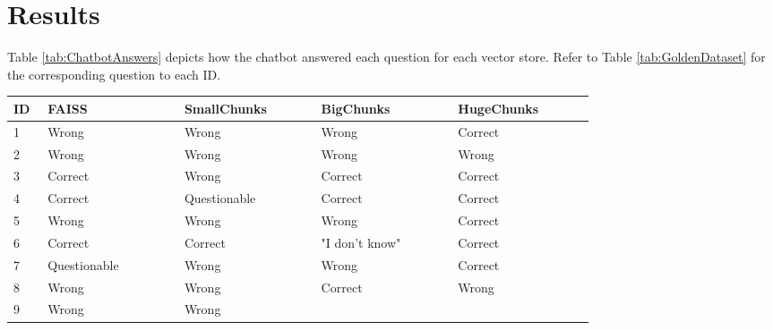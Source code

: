 \section{Results}
Table \ref{tab:ChatbotAnswers} depicts how the chatbot answered each question for each vector store. Refer to 
Table \ref{tab:GoldenDataset} for the corresponding question to each ID.

\begin{longtable}{ | p{0.05\linewidth} | p{0.2\linewidth} | p{0.2\linewidth} | p{0.2\linewidth} | p{0.2\linewidth} | }
    \hline
    \cellcolor{blue!25} ID & \cellcolor{blue!25} FAISS & \cellcolor{blue!25} SmallChunks & \cellcolor{blue!25} BigChunks & \cellcolor{blue!25}HugeChunks \\
    \hline
    \cellcolor{blue!25} 1 & \cellcolor{red!25} Wrong & \cellcolor{red!25} Wrong  
                          & \cellcolor{red!25} Wrong & \cellcolor{green!25} Correct\\
    \hline
    \cellcolor{blue!25} 2 & \cellcolor{red!25} Wrong & \cellcolor{red!25} Wrong
                          & \cellcolor{red!25} Wrong & \cellcolor{red!25} Wrong\\
    \hline 
    \cellcolor{blue!25} 3 & \cellcolor{green!25} Correct & \cellcolor{red!25} Wrong
                          & \cellcolor{green!25} Correct & \cellcolor{green!25} Correct\\
    \hline 
    \cellcolor{blue!25} 4 & \cellcolor{green!25} Correct & \cellcolor{yellow!25} Questionable 
                          & \cellcolor{green!25} Correct & \cellcolor{green!25} Correct \\
    \hline 
    \cellcolor{blue!25} 5 & \cellcolor{red!25} Wrong & \cellcolor{red!25} Wrong 
                          & \cellcolor{red!25} Wrong & \cellcolor{green!25} Correct\\
    \hline 
    \cellcolor{blue!25} 6 & \cellcolor{green!25} Correct & \cellcolor{green!25} Correct 
                          & \cellcolor{red!40} "I don't know" & \cellcolor{green!25} Correct\\
    \hline 
    \cellcolor{blue!25} 7 & \cellcolor{yellow!25} Questionable & \cellcolor{red!25} Wrong 
                          & \cellcolor{red!25} Wrong & \cellcolor{green!25} Correct \\
    \hline 
    \cellcolor{blue!25} 8 & \cellcolor{red!25} Wrong & \cellcolor{red!25} Wrong
                          & \cellcolor{green!25} Correct & \cellcolor{red!25} Wrong \\
    \hline
    \cellcolor{blue!25} 9 & \cellcolor{red!25} Wrong & \cellcolor{red!25} Wrong

\end{longtable}
